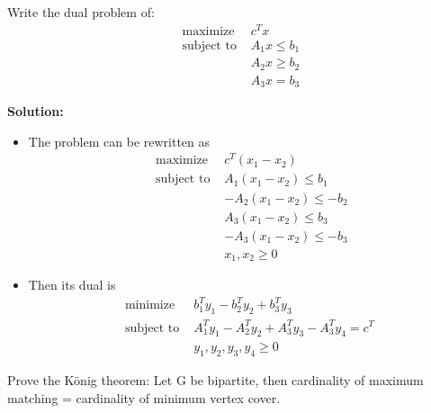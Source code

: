 \documentclass{article}
\newcounter{exercise}
\newcommand{\<}{
    \langle}
\renewcommand{\>}{
    \rangle}
\begin{document}
{\begin{exercise}
	Write the dual problem of:
	$$\begin{aligned}
	&\text { maximize } & c^Tx\\
	&\text { subject to } & A_1x\le b_1 \\
	& &A_2x \ge b_2 \\
	& &A_3x = b_3
	\end{aligned}$$
\end{exercise}

\textbf{Solution:}
\begin{itemize}
    \item The problem can be rewritten as
		$$\begin{aligned}
			&\text { maximize } & c^T(x_1-x_2)\\
			&\text { subject to } & A_1(x_1-x_2)\le b_1 \\
			& &-A_2(x_1-x_2) \le -b_2 \\
			& &A_3(x_1-x_2) \le b_3 \\ 
			& &-A_3(x_1-x_2) \le -b_3 \\ 
			& & x_1,x_2\geq 0
			\end{aligned}$$
    \item Then its dual is 
		$$\begin{aligned}
			&\text {minimize} & b_{1}^{T}y_1-b_{2}^Ty_2 + b_{3}^{T}y_3\\
			&\text {subject to } & A_{1}^{T}y_1-A_{2}^{T}y_2+A_{3}^{T}y_3-A_{3}^{T}y_4=c^T\\
			& & y_1,y_2,y_3,y_4\geq 0
			\end{aligned}$$
\end{itemize}
\newpage


	


\begin{exercise}
	Prove the König theorem: Let G be bipartite, then cardinality of maximum matching = cardinality of minimum vertex cover.
\end{exercise}

}
\end{document}
